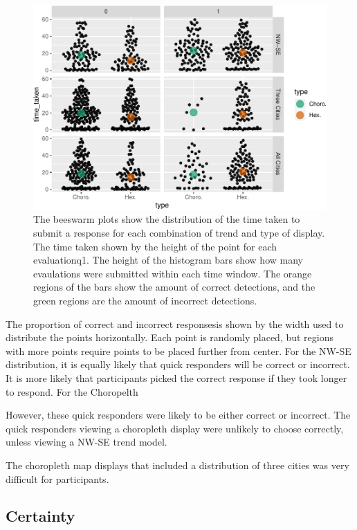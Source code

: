 \documentclass[conference,final,]{IEEEtran}
\makeatletter
\def\maxwidth{\ifdim\Gin@nat@width>\linewidth\linewidth
\else\Gin@nat@width\fi}
\let\Oldincludegraphics\includegraphics
\renewcommand{\includegraphics}[1]{\Oldincludegraphics[width=\maxwidth]{#1}}
\makeatother
\begin{document}
\begin{figure}
\centering
\includegraphics{paper_files/figure-latex/beeswarm-1.pdf}
\caption{The beeswarm plots show the distribution of the time taken to
submit a response for each combination of trend and type of display. The
time taken shown by the height of the point for each evaluationq1. The
height of the histogram bars show how many evaulations were submitted
within each time window. The orange regions of the bars show the amount
of correct detections, and the green regions are the amount of incorrect
detections.}
\end{figure}

The proportion of correct and incorrect responsesis shown by the width
used to distribute the points horizontally. Each point is randomly
placed, but regions with more points require points to be placed further
from center. For the NW-SE distribution, it is equally likely that quick
responders will be correct or incorrect. It is more likely that
participants picked the correct response if they took longer to respond.
For the Choropelth

However, these quick responders were likely to be either correct or
incorrect. The quick responders viewing a choropleth display were
unlikely to choose correctly, unless viewing a NW-SE trend model.

The choropleth map displays that included a distribution of three cities
was very difficult for participants.

\hypertarget{certainty}{%
\subsection{Certainty}\label{certainty}}
\end{document}
